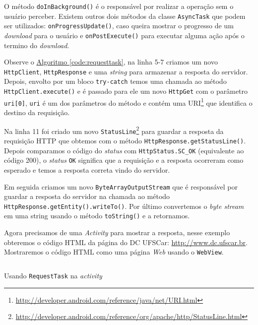 \documentclass[a4paper,12pt,brazil,oneside]{book}
\begin{document}
		O método \texttt{doInBackground()} é o responsável por realizar a operação sem o usuário perceber. Existem outros dois métodos da classe \texttt{AsyncTask} que podem ser utilizados: \texttt{onProgressUpdate()}, caso queira mostrar o progresso de um \emph{download} para o usuário e \texttt{onPostExecute()} para executar alguma ação após o termino do \emph{download}.

		Observe o \hyperref[code:requesttask]{Algoritmo \ref*{code:requesttask}}, na linha 5-7 criamos um novo \texttt{HttpClient}, \texttt{HttpResponse} e uma \emph{string} para armazenar a resposta do servidor. Depois, envolto por um bloco \texttt{try-catch} temos uma chamada ao método \texttt{HttpClient.execute()} e é passado para ele um novo \texttt{HttpGet} com o parâmetro \texttt{uri[0]}, \texttt{uri} é um dos parâmetros do método e contém uma URI\footnote{\href{http://developer.android.com/reference/java/net/URI.html}{http://developer.android.com/reference/java/net/URI.html}} que identifica o destino da requisição.

		Na linha 11 foi criado um novo \texttt{StatusLine}\footnote{\href{http://developer.android.com/reference/org/apache/http/StatusLine.html}{http://developer.android.com/reference/org/apache/http/StatusLine.html}} para guardar a resposta da requisição HTTP que obtemos com o método \texttt{HttpResponse.getStatusLine()}. Depois comparamos o código do \emph{status} com \texttt{HttpStatus.SC\_OK} (equivalente ao código 200), o \emph{status} \texttt{OK} significa que a requisição e a resposta ocorreram como esperado e temos a resposta correta vindo do servidor. 

		Em seguida criamos um novo \texttt{ByteArrayOutputStream} que é responsável por guardar a resposta do servidor na chamada ao método \texttt{HttpResponse.getEntity().writeTo()}. Por último convertemos o \emph{byte stream} em uma string usando o método \texttt{toString()} e a retornamos.

		Agora precisamos de uma \emph{Activity} para mostrar a resposta, nesse exemplo obteremos o código HTML da página do DC UFSCar: \href{http://www.dc.ufscar.br}{http://www.dc.ufscar.br}. Mostraremos o código HTML como uma página \emph{Web} usando o \texttt{WebView}.

		\begin{listing}[H]
		\inputminted[linenos=true,fontsize=\small,frame=lines, framesep=2mm, tabsize=2,numbersep=5pt]{java}{src/api/comm/httpget.java}
		\caption{Usando \texttt{RequestTask} na \emph{activity}}
		\label{code:requestactivity}
		\end{listing}		
\end{document}
